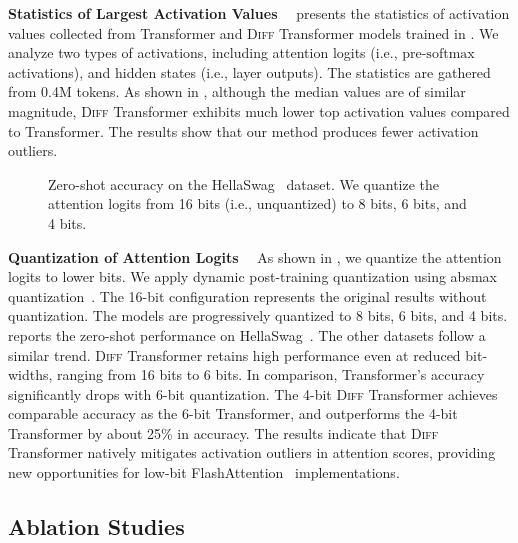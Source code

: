 \documentclass{article}
\newcommand{\mypara}[1]{\textbf{#1}~~}
\newcommand{\softmax}{\mathrm{softmax}}
\newcommand\diff{\textsc{Diff} Transformer}
\newcommand\trm{Transformer}
\begin{document}
\mypara{Statistics of Largest Activation Values}
 presents the statistics of activation values collected from Transformer and \diff{} models trained in .
We analyze two types of activations, including attention logits (i.e., pre-$\softmax$ activations), and hidden states (i.e., layer outputs).
The statistics are gathered from 0.4M tokens.
As shown in , although the median values are of similar magnitude, \diff{} exhibits much lower top activation values compared to Transformer.
The results show that our method produces fewer activation outliers.

\begin{wrapfigure}{r}{0.46\textwidth}
\centering
\setlength\intextsep{0pt}
\caption{Zero-shot accuracy on the HellaSwag~\citep{eval-harness} dataset. We quantize the attention logits from 16 bits (i.e., unquantized) to 8 bits, 6 bits, and 4 bits.}
\label{fig:quant}
\end{wrapfigure}


\mypara{Quantization of Attention Logits}
As shown in , we quantize the attention logits to lower bits.
We apply dynamic post-training quantization using absmax quantization~\citep{efficientsurvey}.
The 16-bit configuration represents the original results without quantization.
The models are progressively quantized to 8 bits, 6 bits, and 4 bits.
 reports the zero-shot performance on HellaSwag~\citep{eval-harness}. The other datasets follow a similar trend.
\diff{} retains high performance even at reduced bit-widths, ranging from 16 bits to 6 bits. In comparison, \trm{}'s accuracy significantly drops with 6-bit quantization.
The 4-bit \diff{} achieves comparable accuracy as the 6-bit Transformer, and outperforms the 4-bit Transformer by about 25\% in accuracy.
The results indicate that \diff{} natively mitigates activation outliers in attention scores, providing new opportunities for low-bit FlashAttention~\citep{fa} implementations.


\subsection{Ablation Studies}
\label{sec:ablation}
\end{document}
